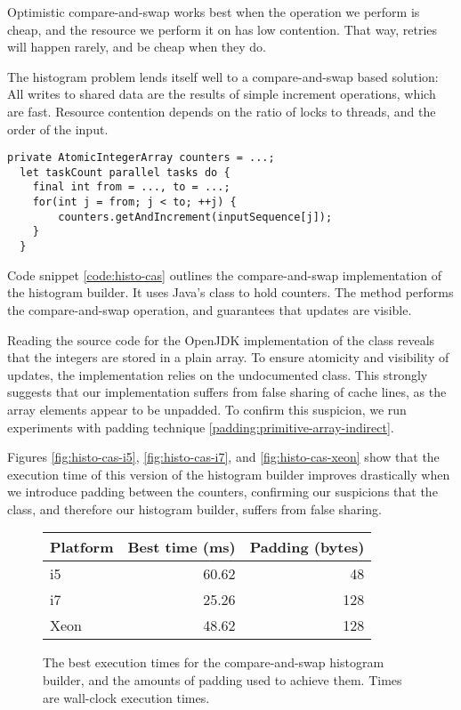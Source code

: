 Optimistic compare-and-swap works best when the operation we perform is cheap,
and the resource we perform it on has low contention. That way, retries will
happen rarely, and be cheap when they do.

The histogram problem lends itself well to a compare-and-swap based solution:
All writes to shared data are the results of simple increment operations, which
are fast. Resource contention depends on the ratio of locks to threads, and the
order of the input.

\begin{code}
\begin{Verbatim}[frame=single]
  private AtomicIntegerArray counters = ...;
  let taskCount parallel tasks do {
    final int from = ..., to = ...;
    for(int j = from; j < to; ++j) {
        counters.getAndIncrement(inputSequence[j]);
    }
  }
\end{Verbatim}
	\caption{Simplified code for the threads in the compare-and-swap 
	version of the histogram builder.}
	\label{code:histo-cas}
\end{code}

Code snippet \ref{code:histo-cas} outlines the compare-and-swap implementation
of the histogram builder. It uses Java's  class to
hold counters. The  method performs the compare-and-swap
operation, and guarantees that updates are visible.

Reading the source code for the OpenJDK implementation of the
 class \cite{atomicinterarraysrc} reveals that
the integers are stored in a plain  array.
To ensure atomicity and visibility of updates, the implementation relies on the
undocumented  class. This strongly suggests that our
implementation suffers from false sharing of cache lines, as the array elements
appear to be unpadded. To confirm this suspicion, we run experiments with
padding technique \ref{padding:primitive-array-indirect}.

Figures \ref{fig:histo-cas-i5}, \ref{fig:histo-cas-i7}, and
\ref{fig:histo-cas-xeon} show that the execution time of this version of the
histogram builder improves drastically when we introduce padding between the
counters, confirming our suspicions that the  class,
and therefore our histogram builder, suffers from false sharing.

\begin{figure}[hbtp]
	\centering
	\begin{tabular}{l r r}
		\hline
		\hline
		Platform & Best time (ms) & Padding (bytes)\\
		\hline
		i5 & 60.62 & 48 \\
		i7 & 25.26 & 128 \\
		Xeon & 48.62 & 128 \\
		\hline
		\hline
	\end{tabular}
	\caption{The best execution times for the compare-and-swap histogram
	builder, and the amounts of padding used to achieve them. Times
	are wall-clock execution times.}
	\label{table:histo-cas}
\end{figure}

